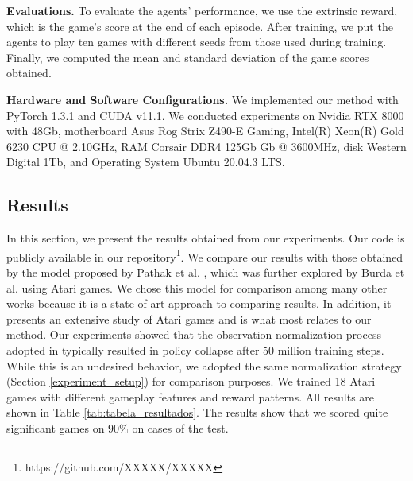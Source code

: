 \textbf{Evaluations.} To evaluate the agents' performance, we use the extrinsic reward, which is the game's score at the end of each episode. After training, we put the agents to play ten games with different seeds from those used during training. Finally, we computed the mean and standard deviation of the game scores obtained.


\textbf{Hardware and Software Configurations.} We implemented our method with PyTorch 1.3.1 and CUDA v11.1. We conducted experiments on Nvidia RTX 8000 with 48Gb, motherboard Asus Rog Strix Z490-E Gaming, Intel(R) Xeon(R) Gold 6230 CPU @ 2.10GHz, RAM Corsair DDR4 125Gb Gb @ 3600MHz, disk Western Digital 1Tb, and Operating System Ubuntu 20.04.3 LTS. 


\subsection{Results}


In this section, we present the results obtained from our experiments. Our code is publicly available in our repository\footnote[1]{https://github.com/XXXXX/XXXXX}. We compare our results with those obtained by the model proposed by Pathak et al. \cite{pathak2017curiosity}, which was further explored by Burda et al. \cite{burda2018large} using Atari games. We chose this model for comparison among many other works because it is a state-of-art approach to comparing results. In addition, it presents an extensive study of Atari games and is what most relates to our method. Our experiments showed that the observation normalization process adopted in \cite{burda2018large} typically resulted in policy collapse after 50 million training steps. While this is an undesired behavior, we adopted the same normalization strategy (Section \ref{experiment_setup}) for comparison purposes. We trained 18 Atari games with different gameplay features and reward patterns. All results are shown in Table \ref{tab:tabela_resultados}. The results show that we scored quite significant games on $90\%$ on cases of the test.

